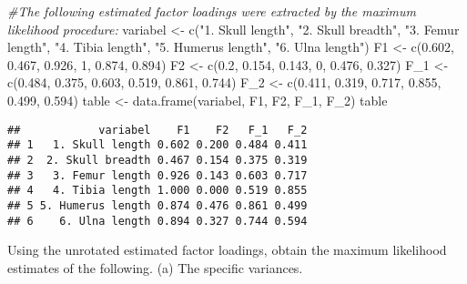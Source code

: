 \documentclass[
]{article}
\newenvironment{Shaded}{\begin{snugshade}}{\end{snugshade}}
\newcommand{\CommentTok}[1]{\textcolor[rgb]{0.56,0.35,0.01}{\textit{#1}}}
\newcommand{\DecValTok}[1]{\textcolor[rgb]{0.00,0.00,0.81}{#1}}
\newcommand{\FloatTok}[1]{\textcolor[rgb]{0.00,0.00,0.81}{#1}}
\newcommand{\FunctionTok}[1]{\textcolor[rgb]{0.00,0.00,0.00}{#1}}
\newcommand{\NormalTok}[1]{#1}
\newcommand{\OtherTok}[1]{\textcolor[rgb]{0.56,0.35,0.01}{#1}}
\newcommand{\StringTok}[1]{\textcolor[rgb]{0.31,0.60,0.02}{#1}}
\begin{document}
\begin{Shaded}
\begin{Highlighting}[]
\CommentTok{\#The following estimated factor loadings were extracted by the maximum likelihood procedure:}
\NormalTok{variabel }\OtherTok{\textless{}{-}} \FunctionTok{c}\NormalTok{(}\StringTok{"1. Skull length"}\NormalTok{,}
                       \StringTok{"2. Skull breadth"}\NormalTok{,}
                       \StringTok{"3. Femur length"}\NormalTok{,}
                       \StringTok{"4. Tibia length"}\NormalTok{,}
                       \StringTok{"5. Humerus length"}\NormalTok{,}
                       \StringTok{"6. Ulna length"}\NormalTok{)}
\NormalTok{F1 }\OtherTok{\textless{}{-}} \FunctionTok{c}\NormalTok{(}\FloatTok{0.602}\NormalTok{,}
        \FloatTok{0.467}\NormalTok{,}
        \FloatTok{0.926}\NormalTok{,}
        \DecValTok{1}\NormalTok{,}
        \FloatTok{0.874}\NormalTok{,}
        \FloatTok{0.894}\NormalTok{)}
\NormalTok{F2 }\OtherTok{\textless{}{-}} \FunctionTok{c}\NormalTok{(}\FloatTok{0.2}\NormalTok{, }\FloatTok{0.154}\NormalTok{, }\FloatTok{0.143}\NormalTok{, }\DecValTok{0}\NormalTok{, }\FloatTok{0.476}\NormalTok{, }\FloatTok{0.327}\NormalTok{)}
\NormalTok{F\_1 }\OtherTok{\textless{}{-}} \FunctionTok{c}\NormalTok{(}\FloatTok{0.484}\NormalTok{, }\FloatTok{0.375}\NormalTok{, }\FloatTok{0.603}\NormalTok{, }\FloatTok{0.519}\NormalTok{, }\FloatTok{0.861}\NormalTok{, }\FloatTok{0.744}\NormalTok{)}
\NormalTok{F\_2 }\OtherTok{\textless{}{-}} \FunctionTok{c}\NormalTok{(}\FloatTok{0.411}\NormalTok{, }\FloatTok{0.319}\NormalTok{, }\FloatTok{0.717}\NormalTok{, }\FloatTok{0.855}\NormalTok{, }\FloatTok{0.499}\NormalTok{, }\FloatTok{0.594}\NormalTok{)}
\NormalTok{table }\OtherTok{\textless{}{-}} \FunctionTok{data.frame}\NormalTok{(variabel, F1, F2, F\_1, F\_2)}
\NormalTok{table}
\end{Highlighting}
\end{Shaded}

\begin{verbatim}
##            variabel    F1    F2   F_1   F_2
## 1   1. Skull length 0.602 0.200 0.484 0.411
## 2  2. Skull breadth 0.467 0.154 0.375 0.319
## 3   3. Femur length 0.926 0.143 0.603 0.717
## 4   4. Tibia length 1.000 0.000 0.519 0.855
## 5 5. Humerus length 0.874 0.476 0.861 0.499
## 6    6. Ulna length 0.894 0.327 0.744 0.594
\end{verbatim}

Using the unrotated estimated factor loadings, obtain the maximum
likelihood estimates of the following. (a) The specific variances.
\end{document}

